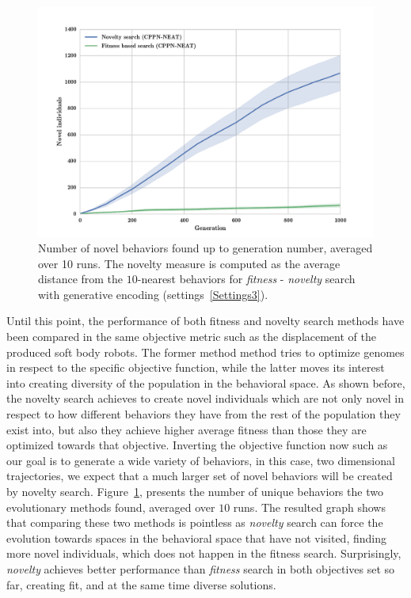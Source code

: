 \begin{figure}[t!]
\centering
\includegraphics[width=1.0\textwidth]{../Figures/Results/novelIndividualsFitNovComp.pdf}
\caption{Number of novel behaviors found up to generation number, averaged over 10 runs. The novelty measure is computed as the average distance from the $10$-nearest behaviors for \emph{fitness} - \emph{novelty} search with generative encoding (settings~\ref{Settings3}).}
\label{fig:novelIndividualsFitNovComp}
\end{figure}

Until this point, the performance of both fitness and novelty search methods have been compared in the same objective metric such as the displacement of the produced soft body robots. The former method method tries to optimize genomes in respect to the specific objective function, while the latter moves its interest into creating diversity of the population in the behavioral space. As shown before, the novelty search achieves to create novel individuals which are not only novel in respect to how different behaviors they have from the rest of the population they exist into, but also they achieve higher average fitness than those they are optimized towards that objective. Inverting the objective function now such as our goal is to generate a wide variety of behaviors, in this case, two dimensional trajectories, we expect that a much larger set of novel behaviors will be created by novelty search. Figure~\ref{fig:novelIndividualsFitNovComp}, presents the number of unique behaviors the two evolutionary methods found, averaged over $10$ runs. The resulted graph shows that comparing these two methods is pointless as \emph{novelty} search can force the evolution towards spaces in the behavioral space that have not visited, finding more novel individuals, which does not happen in the fitness search. Surprisingly, \emph{novelty} achieves better performance than \emph{fitness} search in both objectives set so far, creating fit, and at the same time diverse solutions.

